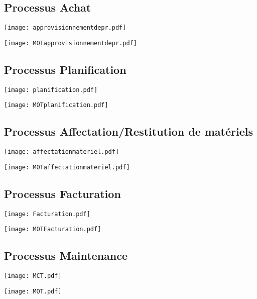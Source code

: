                 \subsection{Processus Achat}
                    \texttt{[image: approvisionnementdepr.pdf]}

                    \texttt{[image: MOTapprovisionnementdepr.pdf]}

                \subsection{Processus Planification}
                    \texttt{[image: planification.pdf]}
                    
                    \texttt{[image: MOTplanification.pdf]}
                
                \subsection{Processus Affectation/Restitution de matériels}
                    \texttt{[image: affectationmateriel.pdf]}

                    \texttt{[image: MOTaffectationmateriel.pdf]}

                \subsection{Processus Facturation}
                    \texttt{[image: Facturation.pdf]}


                    \texttt{[image: MOTFacturation.pdf]}


                \subsection{Processus Maintenance}
                    \texttt{[image: MCT.pdf]}


                    \texttt{[image: MOT.pdf]}

